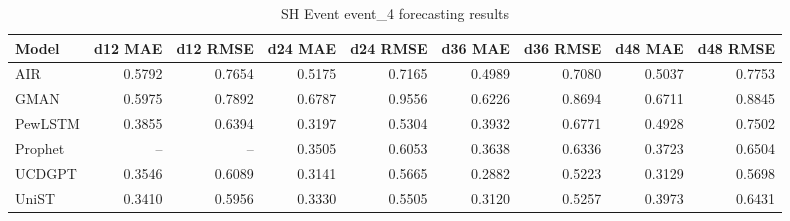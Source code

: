 \begin{table}[htbp]
\centering
\small
\caption{SH Event event\_4 forecasting results}
\label{tab:sh-event-event-4}
\begin{tabular}{lrrrrrrrr}
\toprule
Model & d12 MAE & d12 RMSE & d24 MAE & d24 RMSE & d36 MAE & d36 RMSE & d48 MAE & d48 RMSE \\
\midrule
AIR & 0.5792 & 0.7654 & 0.5175 & 0.7165 & 0.4989 & 0.7080 & 0.5037 & 0.7753 \\
GMAN & 0.5975 & 0.7892 & 0.6787 & 0.9556 & 0.6226 & 0.8694 & 0.6711 & 0.8845 \\
PewLSTM & 0.3855 & 0.6394 & 0.3197 & 0.5304 & 0.3932 & 0.6771 & 0.4928 & 0.7502 \\
Prophet & -- & -- & 0.3505 & 0.6053 & 0.3638 & 0.6336 & 0.3723 & 0.6504 \\
UCDGPT & 0.3546 & 0.6089 & 0.3141 & 0.5665 & 0.2882 & 0.5223 & 0.3129 & 0.5698 \\
UniST & 0.3410 & 0.5956 & 0.3330 & 0.5505 & 0.3120 & 0.5257 & 0.3973 & 0.6431 \\
\bottomrule
\end{tabular}
\end{table}
